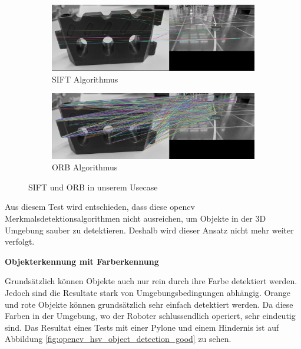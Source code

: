 \begin{figure}[H]
    \centering
\begin{subfigure}{1\textwidth}
    \includegraphics[width=1\linewidth]{assets/informatik-prototyp/opencv/sift/sift_our_usecase_example.png}
    \caption{SIFT Algorithmus}
    \label{fig:bad-sift-example}
\end{subfigure}
\begin{subfigure}{1\textwidth}
    \includegraphics[width=1\linewidth]{assets/informatik-prototyp/opencv/sift/orb_our_usecase_example.png}
    \caption{ORB Algorithmus}
    \label{fig:bad-orb-example}
\end{subfigure}
    \caption{SIFT und ORB in unserem Usecase}
    \label{fig:sift-orb-in-our-usecase}
\end{figure}


Aus diesem Test wird entschieden, dass diese \gls{opencv} Merkmalsdetektionsalgorithmen nicht ausreichen, um Objekte in der 3D Umgebung sauber zu detektieren. Deshalb wird dieser Ansatz nicht mehr weiter verfolgt.

\textbf{Objekterkennung mit Farberkennung}

Grundsätzlich können Objekte auch nur rein durch ihre Farbe detektiert werden. Jedoch sind die Resultate stark von Umgebungsbedingungen abhängig. Orange und rote Objekte können grundsätzlich sehr einfach detektiert werden. Da diese Farben in der Umgebung, wo der Roboter schlussendlich operiert, sehr eindeutig sind. Das Resultat eines Tests mit einer Pylone und einem Hindernis ist auf Abbildung \ref{fig:opencv_hsv_object_detection_good} zu sehen.

